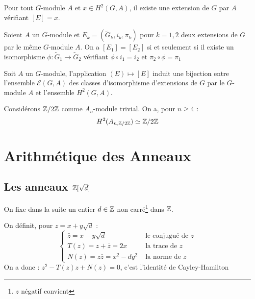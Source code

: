 \documentclass{cours}
\begin{document}
\begin{proposition}
    Pour tout $G$-module $A$ et $x \in H^{2}(G, A)$, il existe une extension de $G$ par $A$ vérifiant $\left[E\right] = x$.
\end{proposition}
\begin{proposition}
    Soient $A$ un $G$-module et $E_{k} = \left(\tilde{G}_{k}, i_{k}, \pi_{k}\right)$ pour $k = 1, 2$ deux extensions de $G$ par le même $G$-module $A$. On a $\left[E_{1}\right] = \left[E_{2}\right]$ si et seulement si il existe un isomorphisme $\phi : \tilde{G}_{1} \rightarrow \tilde{G}_{2}$ vérifiant $\phi \circ i_{1} = i_{2}$ et $\pi_{2} \circ \phi = \pi_{1}$
\end{proposition}
\begin{corollary}
    Soit $A$ un $G$-module, l'application $(E) \mapsto \left[E\right]$ induit une bijection entre l'ensemble $\mathcal{E}(G, A)$ des classes d'isomorphisme d'extensions de $G$ par le $G$-module $A$ et l'ensemble $H^{2}(G, A)$.
\end{corollary}

\begin{theorem}[Schur]
    Considérons $\mathbb{Z}/2\mathbb{Z}$ comme $A_{n}$-module trivial. On a, pour $n \geq 4$ :
    \[
        H^{2}(A_{n, \mathbb{Z}/2\mathbb{Z}}) \simeq \mathbb{Z}/2\mathbb{Z}
    \]
\end{theorem}

\section{Arithmétique des Anneaux}
\subsection{Les anneaux $\mathbb{Z}[\sqrt{d}]$}
On fixe dans la suite un entier $d \in \mathbb{Z}$ non carré\footnote{$z$ négatif convient} dans $\mathbb{Z}$.

\begin{definition}
    On définit, pour $z = x + y\sqrt{d}$ :
    \[
        \begin{cases}
            \bar{z} = x - y\sqrt{d}          & \text{ le conjugué de } z \\
            T(z) = z + \bar{z} = 2x          & \text{ la trace de } z    \\
            N(z) = z\bar{z} = x^{2} - dy^{2} & \text{ la norme de } z
        \end{cases}
    \]
    On a donc : $z^{2} - T(z)z + N(z) = 0$, c'est l'identité de Cayley-Hamilton
\end{definition}
\end{document}
